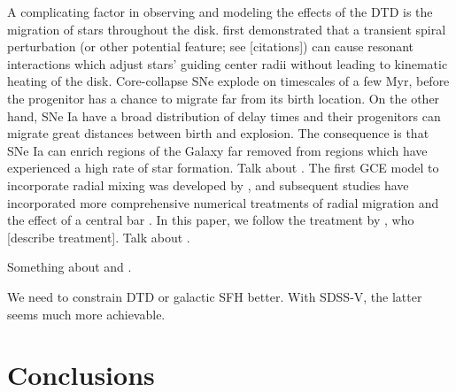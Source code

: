 \documentclass[twocolumn,twocolappendix,linenumbers,trackchanges]{aastex631}
\begin{document}
A complicating factor in observing and modeling the effects of the DTD is the migration of stars throughout the disk. \citet{SellwoodBinney2002-RadialMixing} first demonstrated that a transient spiral perturbation (or other potential feature; see [citations]) can cause resonant interactions which adjust stars' guiding center radii without leading to kinematic heating of the disk. Core-collapse SNe explode on timescales of a few Myr, before the progenitor has a chance to migrate far from its birth location. On the other hand, SNe Ia have a broad distribution of delay times and their progenitors can migrate great distances between birth and explosion. The consequence is that SNe Ia can enrich regions of the Galaxy far removed from regions which have experienced a high rate of star formation. Talk about \citet{Scannapieco2005-ChemicalEnrichment}. The first GCE model to incorporate radial mixing was developed by \citet{Schonrich2009-RadialMixing}, and subsequent studies have incorporated more comprehensive numerical treatments of radial migration and the effect of a central bar \citep[e.g.,][]{Minchev2013-ChemodynamicalEvolution}. In this paper, we follow the treatment by \citet{Johnson2021-Migration}, who [describe treatment]. Talk about \citet{Karapetyan2022-SNIaDistances}.

Something about \citet{Johnson2021-Migration} and \citet{Schonrich2009-RadialMixing}.

We need to constrain DTD or galactic SFH better. With SDSS-V, the latter seems much more achievable.

\section{Conclusions}
\label{sec:conclusions}
\end{document}
